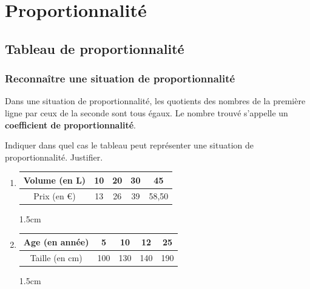 \documentclass[a4paper]{book}
\begin{document}
\setcounter{chapter}{8}
\renewcommand{\monTitre}{Proportionnalité}
\chapter{\monTitre}
\thispagestyle{fancy} 

\section{Tableau de proportionnalité}
\subsection{Reconnaître une situation de proportionnalité}
    
    \begin{propriete} 
        Dans une situation de proportionnalité, les quotients des nombres de la première ligne par ceux de la seconde sont tous égaux. Le nombre trouvé s'appelle un \textbf{coefficient de proportionnalité}.
    \end{propriete}
    
    \begin{exemple} 
        Indiquer dans quel cas le tableau peut représenter une situation de proportionnalité. Justifier.

        \vspace{0.5cm}

        \begin{enumerate}
            \item \begin{tabular}{|c|c|c|c|c|}
                \hline
                Volume (en L) & 10 & 20 & 30 & 45 \\ \hline
                Prix (en €) & 13 & 26 & 39 & 58,50 \\ \hline
            \end{tabular}

            \begin{ZoneReponse}{1.5cm}
            \end{ZoneReponse}
            
            \item \begin{tabular}{|c|c|c|c|c|}
                \hline
                Age (en année) & 5 & 10 & 12 & 25 \\ \hline
                Taille (en cm) & 100 & 130 & 140 & 190 \\ \hline
            \end{tabular}

            \begin{ZoneReponse}{1.5cm}
            \end{ZoneReponse}
        \end{enumerate}
    \end{exemple}
\end{document}

